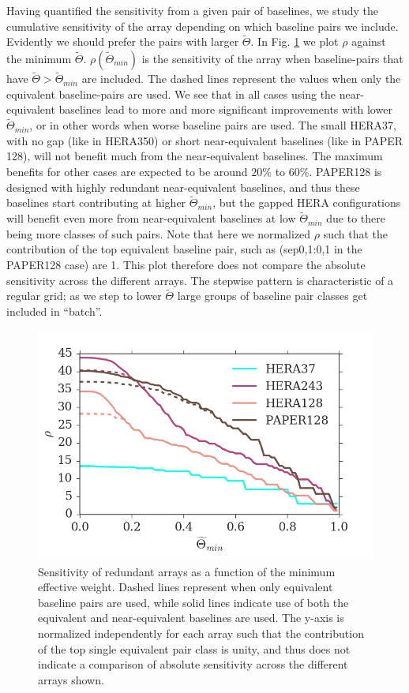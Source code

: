 \documentclass[twocolumn,apj,numberedappendix]{emulateapj}
\renewcommand\[{\begin{equation}}
\renewcommand\]{\end{equation}}
\begin{document}
Having quantified the sensitivity from a given pair of baselines, we study the cumulative sensitivity of the array depending on which baseline pairs we include. Evidently we should prefer the pairs with larger $\widetilde{\Theta}$. In Fig. \ref{fig:osens} we plot $\rho$ against the minimum $\widetilde{\Theta}$. $\rho(\widetilde{\Theta}_{min})$ is the sensitivity of the array when baseline-pairs that have $\widetilde{\Theta}>\widetilde{\Theta}_{min}$ are included. The dashed lines represent the values when only the equivalent baseline-pairs are used.  We see that in all cases using the near-equivalent baselines lead to more and more significant improvements with lower $\widetilde{\Theta}_{min}$, or in other words when worse baseline pairs are used. The small HERA37, with no gap (like in HERA350) or short near-equivalent baselines (like in PAPER 128), will not benefit much from the near-equivalent baselines. The maximum benefits for other cases are expected to be around $20\%$ to $60\%$. PAPER128 is designed with highly redundant near-equivalent baselines, and thus  these baselines start contributing at higher $\widetilde{\Theta}_{min}$, but the gapped HERA configurations will benefit even more from near-equivalent baselines at low $\widetilde{\Theta}_{min}$ due to there being more classes of such pairs. Note that here we normalized $\rho$ such that the contribution of the top equivalent baseline pair, such as (sep0,1:0,1 in the PAPER128 case) are 1. This plot therefore does not compare the absolute sensitivity across the different arrays. The stepwise pattern is characteristic of a regular grid; as we step to lower $\widetilde{\Theta}$ large groups of baseline pair classes get included in ``batch''. 
\begin{figure}[H]
\includegraphics[width=\linewidth]{osens}
\caption{Sensitivity of redundant arrays as a function of the minimum effective weight. Dashed lines represent when only equivalent baseline pairs are used, while solid lines indicate use of both the equivalent and near-equivalent baselines are used. The y-axis is normalized independently for each array such that the contribution of the top single equivalent pair class is unity, and thus does not indicate a comparison of absolute sensitivity across the different arrays shown.  }
\label{fig:osens}
\end{figure}
\end{document}
